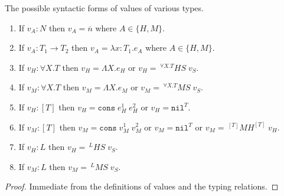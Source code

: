 \begin{lemma}
\label{cf}
\onehalfspacing
The possible syntactic forms of values of various types.
\begin{enumerate}
\item If $v_{A}:N$ then $v_{A}=\overline{n}$ where $A\in\lbrace H,M\rbrace$.
\item If $v_{A}:T_{1}\rightarrow T_{2}$ then $v_{A}=\lambda x:T_{1}.e_{A}$ where $A\in\lbrace H,M\rbrace$.
\item If $v_{H}:\forall X.T$ then $v_{H}=\Lambda X.e_{H}$ or $v_{H}=\,^{\forall X.T}HS\;v_{S}$.
\item If $v_{M}:\forall X.T$ then $v_{M}=\Lambda X.e_{M}$ or $v_{M}=\,^{\forall X.T}MS\;v_{S}$.
\item If $v_{H}:[T]$ then $v_{H}=\mathtt{cons}\;e_{H}^{1}\;e_{H}^{2}$ or $v_{H}=\mathtt{nil}^{T}$.
\item If $v_{M}:[T]$ then $v_{M}=\mathtt{cons}\;v_{M}^{1}\;v_{M}^{2}$ or $v_{M}=\mathtt{nil}^{T}$ or $v_{M}=\,^{[T]}MH^{[T]}\;v_{H}$.
\item If $v_{H}:L$ then $v_{H}=\,^{L}HS\;v_{S}$.
\item If $v_{M}:L$ then $v_{M}=\,^{L}MS\;v_{S}$.
\end{enumerate}
\begin{proof}
Immediate from the definitions of values and the typing relations.
\end{proof}
\end{lemma}